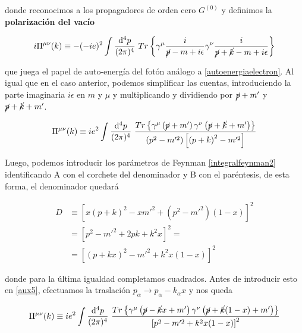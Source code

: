 \documentclass{article}
\numberwithin{equation}{section}
\begin{document}
donde reconocimos a los propagadores de orden cero $ G^{(0)} $ y definimos la \textbf{polarización del vacío}

\begin{equation}\label{vacumpolarization}
i \Pi^{\mu\nu}(k) \equiv -(-ie)^{2} \int \frac{\mathrm{d^4}p}{(2\pi)^4} \ Tr\left\{ \gamma^{\mu} \frac{i}{\cancel{p} -m+i\epsilon} \gamma^{\nu} \frac{i}{\cancel{p} + \cancel{k} -m +i\epsilon}   \right\}
\end{equation}

que juega el papel de auto-energía del fotón análogo a \ref{autoenergiaelectron}. Al igual que en el caso anterior, podemos simplificar las cuentas, introduciendo la parte imaginaria $ i\epsilon $ en $ m $ y $ \mu $ y multiplicando y dividiendo por $ \cancel{p}+m' $ y $ \cancel{p}+\cancel{k}+m' $.

\begin{equation}\label{aux5}
\Pi^{\mu\nu}(k) \equiv i e^2 \int \frac{\mathrm{d^4}p}{(2\pi)^4} \ \frac{Tr\left\{ \gamma^{\mu}\left(\cancel{p}+m'\right)\gamma^{\nu}\left(\cancel{p}+\cancel{k}+m'\right) \right\}}{\left(p^2 -m'^2\right)\left[\left(p+k\right)^2 -m'^2 \right]}   
\end{equation}

Luego, podemos introducir los parámetros de Feynman \ref{integralfeynman2} identificando A con el corchete del denominador y B con el paréntesis, de esta forma, el denominador quedará

\begin{equation}\label{key}
\begin{aligned}
D&\equiv \left[x\left(p+k\right)^2-xm'^2 + \left(p^2 - m'^2\right)(1-x)\right]^2\\
&=\left[p^2-m'^2 + 2pk + k^2x\right]^2=\\
&=\left[\left(p+kx\right)^2 - m'^2 + k^2x(1-x)\right]^2
\end{aligned}
\end{equation}

donde para la última igualdad completamos cuadrados. Antes de introducir esto en \ref{aux5}, efectuamos la traslación $ p_{\alpha} \longrightarrow p_{\alpha} - k_{\alpha}x $ y nos queda

\begin{equation}
\Pi^{\mu\nu}(k) \equiv i e^2 \int \frac{\mathrm{d^4}p}{(2\pi)^4} \ \frac{Tr\left\{ \gamma^{\mu}\left(\cancel{p}-\cancel{k}x +m'\right)\gamma^{\nu}\left(\cancel{p}+\cancel{k}(1-x)+m'\right) \right\}}{\left[p^2 -m'^2 + k^2x(1-x)\right]^2}   
\end{equation}
\end{document}
